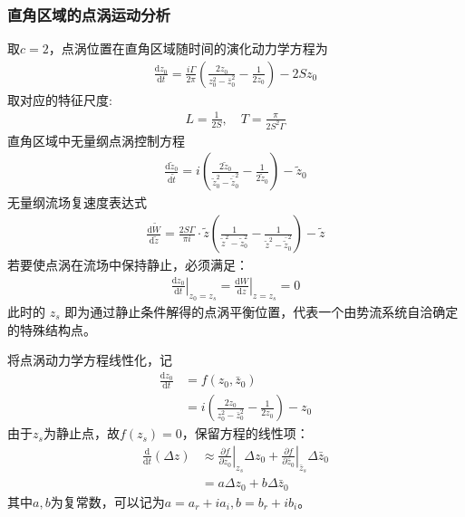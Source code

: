 \subsubsection{直角区域的点涡运动分析}
取$c=2$，点涡位置在直角区域随时间的演化动力学方程为
\begin{align*}
    \frac{\mathrm{d}z_{0}}{\mathrm{d}t}=\frac{i\Gamma}{2\pi}\left(\frac{2z_{0}}{z_{0}^{2}-\bar{z}_{0}^{2}}-\frac{1}{2z_{0}} \right) - 2Sz_{0}
\end{align*}
取对应的特征尺度:
\begin{align*}
    L = \frac{1}{2S}, \quad
    T = \frac{\pi}{2S^{2}\Gamma}
\end{align*}
直角区域中无量纲点涡控制方程
\begin{align}
    \boxed{
    \frac{\mathrm{d}\tilde{z}_{0}}{\mathrm{d}\tilde{t}} = i\left( \frac{2\tilde{z}_0}{\tilde{z}_0^2 - \bar{\tilde{z}}_0^2} -\frac{1}{2\tilde{z}_0} \right) - \tilde{z}_0
    }
\end{align} 
无量纲流场复速度表达式
\begin{align*}
    \frac{\mathrm{d}\tilde{W}}{\mathrm{d}\tilde{z}} = \frac{2S\Gamma}{\pi i} \cdot \tilde{z} \left( \frac{1}{\tilde{z}^{2} - \tilde{z}_0^{2}} - \frac{1}{\tilde{z}^{2} - \bar{\tilde{z}}_0^{2}} \right) - \tilde{z}
\end{align*}
若要使点涡在流场中保持静止，必须满足：
\begin{align}
    \left.\frac{\mathrm{d}z_{0}}{\mathrm{d}t}\right|_{z_{0}=z_{s}}=\left.\frac{\mathrm{d}W}{\mathrm{d}z}\right|_{z=z_{s}}=0
\end{align}
此时的 $z_s$ 即为通过静止条件解得的点涡平衡位置，代表一个由势流系统自洽确定的特殊结构点。

将点涡动力学方程线性化，记
\begin{align}
    \frac{\mathrm{d}{z}_{0}}{\mathrm{d}{t}} &=f(z_{0},\bar{z}_{0}) \\
    &=i\left( \frac{2{z}_0}{{z}_0^2 - \bar{{z}}_0^2} -\frac{1}{2{z}_0} \right) - {z}_0
\end{align}
由于$z_{s}$为静止点，故$f(z_{s})=0$，保留方程的线性项：
\begin{align*}
    \frac{\mathrm{d}}{\mathrm{d}t}(\Delta z)&\approx \left.\frac{\partial f}{\partial z_{0}}\right|_{z_{s}}\Delta z_{0}+\left.\frac{\partial f}{\partial \bar{z}_{0}}\right|_{\bar{z}_{s}}\Delta \bar{z}_{0}\\
    &=a\Delta z_{0}+b\Delta \bar{z}_{0}
\end{align*}
其中$a,b$为复常数，可以记为$a=a_{r}+ia_{i},b=b_{r}+ib_{i}$。

